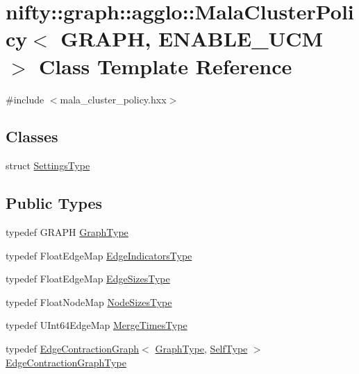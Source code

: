 \hypertarget{classnifty_1_1graph_1_1agglo_1_1MalaClusterPolicy}{}\section{nifty\+:\+:graph\+:\+:agglo\+:\+:Mala\+Cluster\+Policy$<$ G\+R\+A\+PH, E\+N\+A\+B\+L\+E\+\_\+\+U\+CM $>$ Class Template Reference}
\label{classnifty_1_1graph_1_1agglo_1_1MalaClusterPolicy}


{\ttfamily \#include $<$mala\+\_\+cluster\+\_\+policy.\+hxx$>$}

\subsection*{Classes}
\begin{DoxyCompactItemize}
\item 
struct \hyperlink{structnifty_1_1graph_1_1agglo_1_1MalaClusterPolicy_1_1SettingsType}{Settings\+Type}
\end{DoxyCompactItemize}
\subsection*{Public Types}
\begin{DoxyCompactItemize}
\item 
typedef G\+R\+A\+PH \hyperlink{classnifty_1_1graph_1_1agglo_1_1MalaClusterPolicy_ae2696b85f3f04787282e003bead20a5d}{Graph\+Type}
\item 
typedef Float\+Edge\+Map \hyperlink{classnifty_1_1graph_1_1agglo_1_1MalaClusterPolicy_acc2c04742b370c093267afd17a14bb0c}{Edge\+Indicators\+Type}
\item 
typedef Float\+Edge\+Map \hyperlink{classnifty_1_1graph_1_1agglo_1_1MalaClusterPolicy_a33924545e782bd520270341b21599e7e}{Edge\+Sizes\+Type}
\item 
typedef Float\+Node\+Map \hyperlink{classnifty_1_1graph_1_1agglo_1_1MalaClusterPolicy_a559774b548ec31fb481a848a12a45abe}{Node\+Sizes\+Type}
\item 
typedef U\+Int64\+Edge\+Map \hyperlink{classnifty_1_1graph_1_1agglo_1_1MalaClusterPolicy_aa786f31f24cedb64409047e19eb2e7c4}{Merge\+Times\+Type}
\item 
typedef \hyperlink{classnifty_1_1graph_1_1EdgeContractionGraph}{Edge\+Contraction\+Graph}$<$ \hyperlink{classnifty_1_1graph_1_1agglo_1_1MalaClusterPolicy_ae2696b85f3f04787282e003bead20a5d}{Graph\+Type}, \hyperlink{classnifty_1_1graph_1_1agglo_1_1MalaClusterPolicy}{Self\+Type} $>$ \hyperlink{classnifty_1_1graph_1_1agglo_1_1MalaClusterPolicy_a77a5b41304b53955aafbf214e2ad356f}{Edge\+Contraction\+Graph\+Type}
\end{DoxyCompactItemize}
